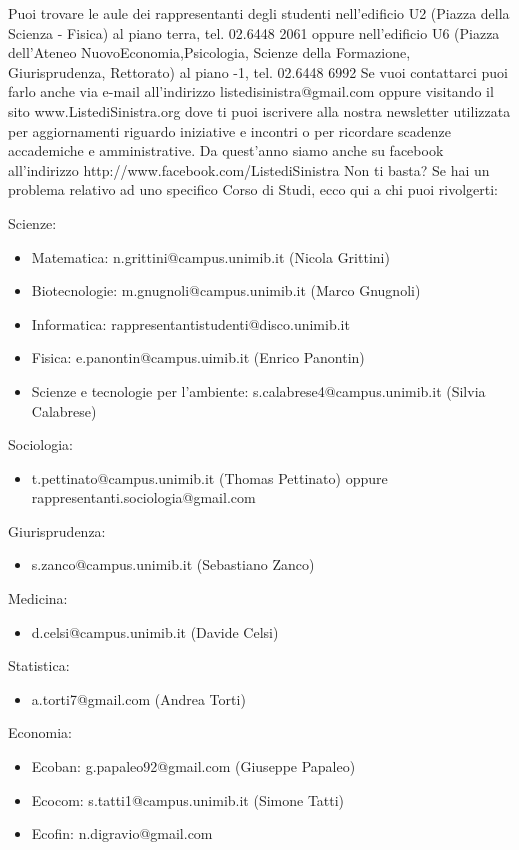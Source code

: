 Puoi trovare le aule dei rappresentanti degli studenti  nell'edificio U2 (Piazza della Scienza - Fisica) al piano terra, tel. 02.6448 2061 oppure nell'edificio U6 (Piazza dell'Ateneo NuovoEconomia,Psicologia, Scienze della Formazione, Giurisprudenza, Rettorato) al piano -1, tel. 02.6448 6992
Se vuoi contattarci puoi farlo anche via e-mail all’indirizzo listedisinistra@gmail.com oppure visitando il sito www.ListediSinistra.org dove ti puoi iscrivere alla nostra newsletter utilizzata per aggiornamenti riguardo iniziative e incontri o per ricordare scadenze accademiche e amministrative.
Da quest'anno siamo anche su facebook all'indirizzo http://www.facebook.com/ListediSinistra 
Non ti basta? Se hai un problema relativo ad uno specifico Corso di Studi, ecco qui a chi puoi rivolgerti:

Scienze:
\begin{itemize}
\item Matematica: n.grittini@campus.unimib.it (Nicola Grittini)
\item Biotecnologie: m.gnugnoli@campus.unimib.it (Marco Gnugnoli)
\item Informatica: rappresentantistudenti@disco.unimib.it
\item Fisica: e.panontin@campus.uimib.it (Enrico Panontin)
\item Scienze e tecnologie per l'ambiente: s.calabrese4@campus.unimib.it (Silvia Calabrese)
\end{itemize}   
Sociologia: 
\begin{itemize}
\item t.pettinato@campus.unimib.it (Thomas Pettinato) oppure rappresentanti.sociologia@gmail.com
\end{itemize}
Giurisprudenza:
\begin{itemize}
\item s.zanco@campus.unimib.it (Sebastiano Zanco)
\end{itemize}   
Medicina: 
\begin{itemize}
\item d.celsi@campus.unimib.it (Davide Celsi)
\end{itemize}   
Statistica: 
\begin{itemize}
\item a.torti7@gmail.com (Andrea Torti)
\end{itemize}
Economia: 
\begin{itemize}
\item Ecoban: g.papaleo92@gmail.com (Giuseppe Papaleo)
\item Ecocom: s.tatti1@campus.unimib.it (Simone Tatti)
\item Ecofin: n.digravio@gmail.com
\end{itemize}

